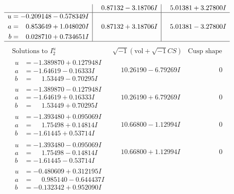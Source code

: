 \documentclass[1p]{elsarticle_modified}
\theoremstyle{definition}
\newcommand{\I}{\sqrt{-1}}
\begin{document}
$$\begin{array}{c|c|c}
 & \phantom{-}0.87132 - 3.18706 I & \phantom{-}5.01381 + 3.27800 I \\ \hline\begin{aligned}
u &= -0.209148 - 0.578349 I \\
a &= \phantom{-}0.853649 + 1.048020 I \\
b &= \phantom{-}0.028710 + 0.734651 I\end{aligned}
 & \phantom{-}0.87132 + 3.18706 I & \phantom{-}5.01381 - 3.27800 I\\
 \hline 
 \end{array}$$\newpage$$\begin{array}{c|c|c}  
\text{Solutions to }I^u_{2}& \I (\text{vol} + \sqrt{-1}CS) & \text{Cusp shape}\\
 \hline 
\begin{aligned}
u &= -1.389870 + 0.127948 I \\
a &= -1.64619 - 0.16333 I \\
b &= \phantom{-}1.53449 - 0.70295 I\end{aligned}
 & \phantom{-}10.26190 - 6.79269 I & \phantom{-0.000000 } 0 \\ \hline\begin{aligned}
u &= -1.389870 - 0.127948 I \\
a &= -1.64619 + 0.16333 I \\
b &= \phantom{-}1.53449 + 0.70295 I\end{aligned}
 & \phantom{-}10.26190 + 6.79269 I & \phantom{-0.000000 } 0 \\ \hline\begin{aligned}
u &= -1.393480 + 0.095069 I \\
a &= \phantom{-}1.75498 + 0.14814 I \\
b &= -1.61445 + 0.53714 I\end{aligned}
 & \phantom{-}10.66800 - 1.12994 I & \phantom{-0.000000 } 0 \\ \hline\begin{aligned}
u &= -1.393480 - 0.095069 I \\
a &= \phantom{-}1.75498 - 0.14814 I \\
b &= -1.61445 - 0.53714 I\end{aligned}
 & \phantom{-}10.66800 + 1.12994 I & \phantom{-0.000000 } 0 \\ \hline\begin{aligned}
u &= -0.480609 + 0.312195 I \\
a &= \phantom{-}0.985140 - 0.644437 I \\
b &= -0.132342 + 0.952090 I\end{aligned}

\end{array}$$
\end{document}
